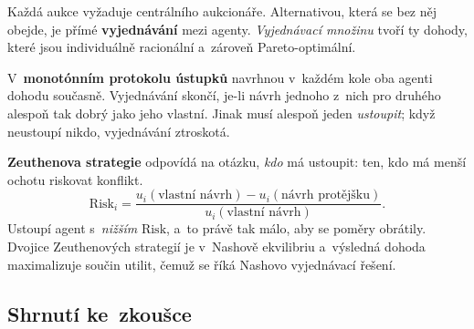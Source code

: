\documentclass[11pt,a4paper]{article}
\theoremstyle{definition}
\begin{document}
\begin{defbox}
Každá aukce vyžaduje centrálního aukcionáře. Alternativou, která se bez něj obejde, je přímé
\textbf{vyjednávání} mezi agenty. \emph{Vyjednávací množinu} tvoří ty dohody, které jsou
individuálně racionální a~zároveň Pareto-optimální.

V~\textbf{monotónním protokolu ústupků} navrhnou v~každém kole oba agenti dohodu současně.
Vyjednávání skončí, je-li návrh jednoho z~nich pro druhého alespoň tak dobrý jako jeho vlastní.
Jinak musí alespoň jeden \emph{ustoupit}; když neustoupí nikdo, vyjednávání ztroskotá.

\textbf{Zeuthenova strategie} odpovídá na otázku, \emph{kdo} má ustoupit: ten, kdo má menší
ochotu riskovat konflikt.
\[
\mathrm{Risk}_i = \frac{u_i(\text{vlastní návrh}) - u_i(\text{návrh protějšku})}
{u_i(\text{vlastní návrh})} .
\]
Ustoupí agent s~\emph{nižším} $\mathrm{Risk}$, a~to právě tak málo, aby se poměry obrátily.
Dvojice Zeuthenových strategií je v~Nashově ekvilibriu a~výsledná dohoda maximalizuje součin
utilit, čemuž se říká Nashovo vyjednávací řešení.
\end{defbox}

\subsection{Shrnutí ke~zkoušce}
\end{document}
